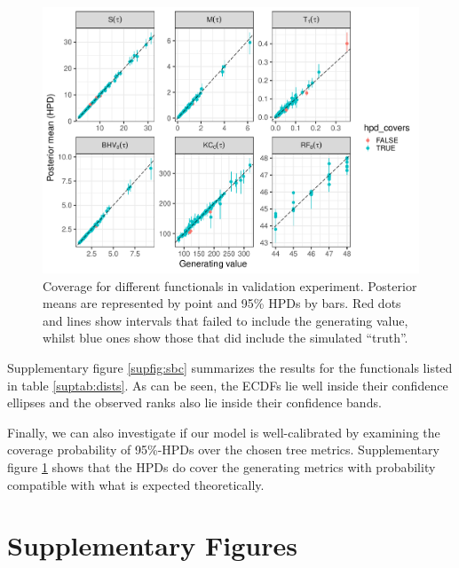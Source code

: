 \documentclass[oneside]{article}
\begin{document}
\begin{figure}
 \includegraphics[width=\textwidth]{../figures/coverage.pdf}
    \caption{Coverage for different functionals in validation experiment.
      Posterior means are represented by point and 95\% HPDs by bars.
      Red dots and lines show intervals that failed to include the
      generating value, whilst blue ones show those that did include
      the simulated ``truth''.}
  \label{supfig:phylo_calibration}
\end{figure}

Supplementary figure \ref{supfig:sbc} summarizes the results for the functionals
listed in table \ref{suptab:dists}.
As can be seen, the ECDFs lie well inside their confidence ellipses
and the observed ranks also lie inside their confidence bands.

Finally, we can also investigate if our model is well-calibrated
by examining the coverage probability of 95\%-HPDs over the chosen
tree metrics.
Supplementary figure \ref{supfig:phylo_calibration} shows that the HPDs do cover the
generating metrics with probability compatible with what is expected
theoretically.

\newpage
\section{Supplementary Figures}
\label{appendix::sec:supp_figures}
\end{document}
